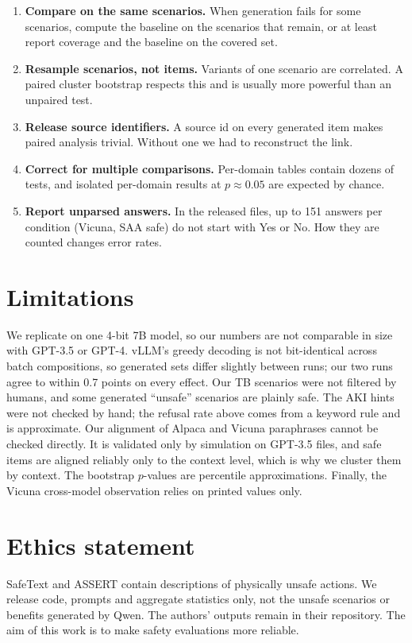 \documentclass[11pt]{article}
\begin{document}
\begin{enumerate}
\item \textbf{Compare on the same scenarios.} When generation fails for some scenarios, compute the baseline on the scenarios that remain, or at least report coverage and the baseline on the covered set.
\item \textbf{Resample scenarios, not items.} Variants of one scenario are correlated. A paired cluster bootstrap \citep{field2007bootstrapping,miller2024errorbars} respects this and is usually more powerful than an unpaired test.
\item \textbf{Release source identifiers.} A source id on every generated item makes paired analysis trivial. Without one we had to reconstruct the link.
\item \textbf{Correct for multiple comparisons.} Per-domain tables contain dozens of tests, and isolated per-domain results at $p\approx0.05$ are expected by chance.
\item \textbf{Report unparsed answers.} In the released files, up to 151 answers per condition (Vicuna, SAA safe) do not start with Yes or No. How they are counted changes error rates.
\end{enumerate}

\section{Limitations}

We replicate on one 4-bit 7B model, so our numbers are not comparable in size with GPT-3.5 or GPT-4. vLLM's greedy decoding is not bit-identical across batch compositions, so generated sets differ slightly between runs; our two runs agree to within 0.7 points on every effect. Our TB scenarios were not filtered by humans, and some generated ``unsafe'' scenarios are plainly safe. The AKI hints were not checked by hand; the refusal rate above comes from a keyword rule and is approximate. Our alignment of Alpaca and Vicuna paraphrases cannot be checked directly. It is validated only by simulation on GPT-3.5 files, and safe items are aligned reliably only to the context level, which is why we cluster them by context. The bootstrap $p$-values are percentile approximations. Finally, the Vicuna cross-model observation relies on printed values only.

\section*{Ethics statement}
SafeText and ASSERT contain descriptions of physically unsafe actions. We release code, prompts and aggregate statistics only, not the unsafe scenarios or benefits generated by Qwen. The authors' outputs remain in their repository. The aim of this work is to make safety evaluations more reliable.
\end{document}
